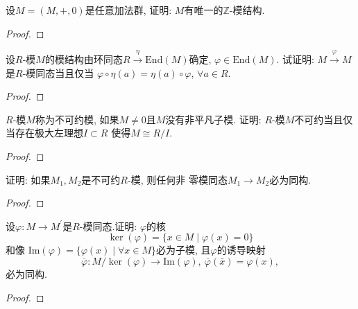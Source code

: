\begin{problem}
    设$M = (M, +, 0)$是任意加法群, 证明: $M$有唯一的$\mathbb{Z}$-模结构.
\end{problem}

\begin{proof}
    
\end{proof}

\begin{problem}
    设$R$-模$M$的模结构由环同态$R \xrightarrow{\eta} \mathrm{End}(M)$确定, 
$\varphi \in \mathrm{End}(M)$. 试证明: 
$M \xrightarrow{\varphi} M$是$R$-模同态当且仅当
$\varphi \circ \eta (a) = \eta (a) \circ \varphi$, $\forall a \in R$.
\end{problem}

\begin{proof}
    
\end{proof}

\begin{problem}
    $R$-模$M$称为不可约模, 如果$M \neq 0$且$M$没有非平凡子模.
证明: $R$-模$M$不可约当且仅当存在极大左理想$I \subset R$
使得$M \cong R/I$.
\end{problem}

\begin{proof}
    
\end{proof}

\begin{problem}[舒尔(Schur)引理]
    证明: 如果$M_1, M_2$是不可约$R$-模, 则任何非
零模同态$M_1 \to M_2$必为同构.
\end{problem}

\begin{proof}
    
\end{proof}

\begin{problem}[同态基本定理]
    设$\varphi:M\to M^{\prime}$是$R$-模同态.证明: $\varphi$的核
\[
    \ker(\varphi) = \{x \in M \mid \varphi(x) = 0\}
\]
和像 $\mathrm{Im}(\varphi) = \{\varphi(x) \mid \forall x \in M\}$必为子模, 
且$\varphi$的诱导映射
\[
    \overline{\varphi}:M/\ker(\varphi) \to \mathrm{Im}(\varphi),\: \overline{\varphi}(\bar{x}) = \varphi(x),
\]
必为同构.
\end{problem}

\begin{proof}
    
\end{proof}